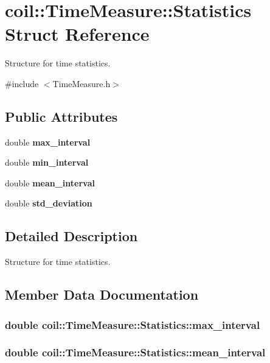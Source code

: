 \section{coil::TimeMeasure::Statistics Struct Reference}
\label{structcoil_1_1TimeMeasure_1_1Statistics}


Structure for time statistics.  




{\ttfamily \#include $<$TimeMeasure.h$>$}

\subsection*{Public Attributes}
\begin{DoxyCompactItemize}
\item 
double {\bf max\_\-interval}
\item 
double {\bf min\_\-interval}
\item 
double {\bf mean\_\-interval}
\item 
double {\bf std\_\-deviation}
\end{DoxyCompactItemize}


\subsection{Detailed Description}
Structure for time statistics. 

\subsection{Member Data Documentation}
\subsubsection[{max\_\-interval}]{\setlength{\rightskip}{0pt plus 5cm}double {\bf coil::TimeMeasure::Statistics::max\_\-interval}}\label{structcoil_1_1TimeMeasure_1_1Statistics_a7f638b197a07faee249ff6a776d51e56}
\subsubsection[{mean\_\-interval}]{\setlength{\rightskip}{0pt plus 5cm}double {\bf coil::TimeMeasure::Statistics::mean\_\-interval}}\label{structcoil_1_1TimeMeasure_1_1Statistics_a3f64672ab55d839078c922245c75ea6b}
